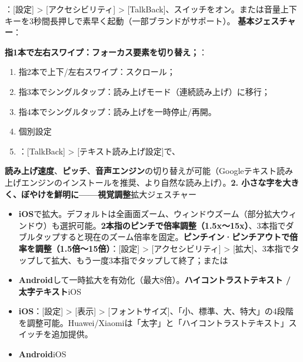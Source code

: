 \begin{tcbinfo}{：[設定] > [アクセシビリティ] > [TalkBack]、スイッチをオン。または音量上下キーを3秒間長押しで素早く起動（一部ブランドがサポート）。}
\textbf{基本ジェスチャー}：

\textbf{指1本で左右スワイプ：フォーカス要素を切り替え；}：

\begin{enumerate}
  \item 指2本で上下/左右スワイプ：スクロール；
  \item 指3本でシングルタップ：読み上げモード（連続読み上げ）に移行；
  \item 指4本でシングルタップ：読み上げを一時停止/再開。
  \item 個別設定
  \item ：[TalkBack] > [テキスト読み上げ設定]で、
\end{enumerate}

\textbf{読み上げ速度}、\textbf{ピッチ}、\textbf{音声エンジン}の切り替えが可能（Googleテキスト読み上げエンジンのインストールを推奨、より自然な読み上げ）。\textbf{2. 小さな字を大きく、ぼやけを鮮明に——視覚調整}拡大ジェスチャー

\end{tcbinfo}



\begin{itemize}
  \item \textbf{iOS}で拡大。デフォルトは全画面ズーム、ウィンドウズーム（部分拡大ウィンドウ）も選択可能。\textbf{2本指のピンチで倍率調整（1.5x〜15x）}、3本指でダブルタップすると現在のズーム倍率を固定。\textbf{ピンチイン·ピンチアウトで倍率を調整（1.5倍〜15倍）}：[設定] > [アクセシビリティ] > [拡大]、3本指でタップして拡大、もう一度3本指でタップして終了；または
  \item \textbf{Android}して一時拡大を有効化（最大8倍）。\textbf{ハイコントラストテキスト / 太字テキスト}iOS
\end{itemize}


\begin{itemize}
  \item \textbf{iOS}：[設定] > [表示] > [フォントサイズ]、「小、標準、大、特大」の4段階を調整可能。Huawei/Xiaomiは「太字」と「ハイコントラストテキスト」スイッチを追加提供。
  \item \textbf{Android}iOS
\end{itemize}

